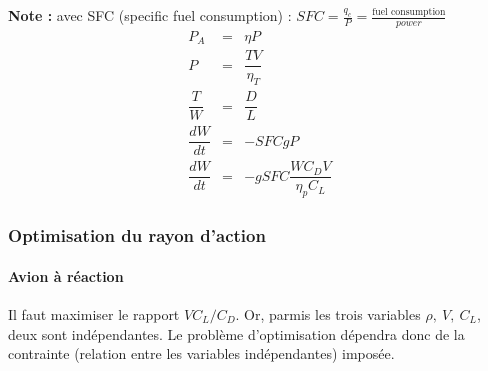 \documentclass{report}
\begin{document}
\textbf{Note :}
avec SFC (specific fuel consumption) : $SFC=\frac{q_c}{P}=\frac{\text{fuel consumption}}{power}$
\begin{eqnarray}
P_A &= &\eta P\\
P &= &\dfrac{TV}{\eta_T}\\
\dfrac{T}{W} &= &\dfrac{D}{L}\\
\dfrac{dW}{dt} &= &-SFC g P\\
\dfrac{dW}{dt} &= &-g SFC \dfrac{W C_D V}{\eta_p C_L}
\end{eqnarray}

\subsubsection{Optimisation du rayon d'action}

\paragraph{Avion à réaction} Il faut maximiser le rapport $VC_L/C_D$. Or, parmis les trois variables $\rho,~V,~C_L$, deux sont indépendantes. Le problème d'optimisation dépendra donc de la contrainte (relation entre les variables indépendantes) imposée.
\end{document}

